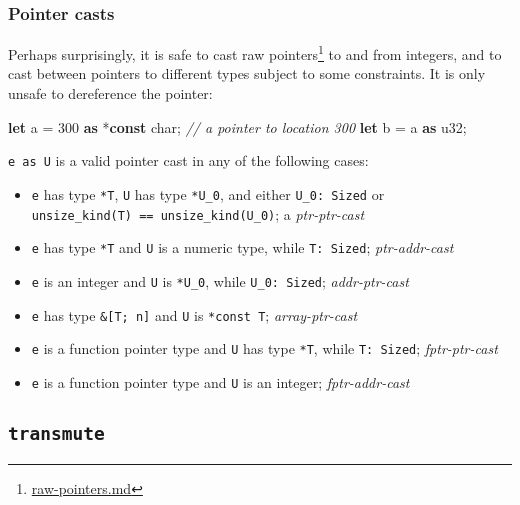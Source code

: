 \documentclass[a4paper,]{book}
\newenvironment{Shaded}{\begin{snugshade}}{\end{snugshade}}
\newcommand{\KeywordTok}[1]{\textcolor[rgb]{0.13,0.29,0.53}{\textbf{{#1}}}}
\newcommand{\DataTypeTok}[1]{\textcolor[rgb]{0.13,0.29,0.53}{{#1}}}
\newcommand{\DecValTok}[1]{\textcolor[rgb]{0.00,0.00,0.81}{{#1}}}
\newcommand{\CommentTok}[1]{\textcolor[rgb]{0.56,0.35,0.01}{\textit{{#1}}}}
\newcommand{\NormalTok}[1]{{#1}}
\renewcommand{\href}[2]{#2\footnote{\url{#1}}}
\begin{document}
\subsubsection{Pointer casts}\label{pointer-casts}

Perhaps surprisingly, it is safe to cast \href{raw-pointers.md}{raw
pointers} to and from integers, and to cast between pointers to
different types subject to some constraints. It is only unsafe to
dereference the pointer:

\begin{Shaded}
\begin{Highlighting}[]
\KeywordTok{let} \NormalTok{a = }\DecValTok{300} \KeywordTok{as} \NormalTok{*}\KeywordTok{const} \DataTypeTok{char}\NormalTok{; }\CommentTok{// a pointer to location 300}
\KeywordTok{let} \NormalTok{b = a }\KeywordTok{as} \DataTypeTok{u32}\NormalTok{;}
\end{Highlighting}
\end{Shaded}

\texttt{e\ as\ U} is a valid pointer cast in any of the following cases:

\begin{itemize}
\item
  \texttt{e} has type \texttt{*T}, \texttt{U} has type \texttt{*U\_0},
  and either \texttt{U\_0:\ Sized} or
  \texttt{unsize\_kind(T)\ ==\ unsize\_kind(U\_0)}; a
  \emph{ptr-ptr-cast}
\item
  \texttt{e} has type \texttt{*T} and \texttt{U} is a numeric type,
  while \texttt{T:\ Sized}; \emph{ptr-addr-cast}
\item
  \texttt{e} is an integer and \texttt{U} is \texttt{*U\_0}, while
  \texttt{U\_0:\ Sized}; \emph{addr-ptr-cast}
\item
  \texttt{e} has type \texttt{\&{[}T;\ n{]}} and \texttt{U} is
  \texttt{*const\ T}; \emph{array-ptr-cast}
\item
  \texttt{e} is a function pointer type and \texttt{U} has type
  \texttt{*T}, while \texttt{T:\ Sized}; \emph{fptr-ptr-cast}
\item
  \texttt{e} is a function pointer type and \texttt{U} is an integer;
  \emph{fptr-addr-cast}
\end{itemize}

\subsection{\texorpdfstring{\texttt{transmute}}{transmute}}\label{transmute}
\end{document}
